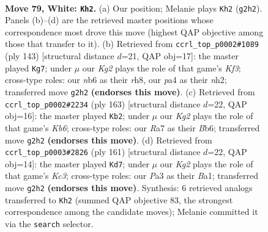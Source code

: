 \documentclass[11pt]{article}
\begin{document}
\clearpage

\begin{figure}[p]\centering
\begin{subfigure}{0.46\textwidth}\centering
\resizebox{\linewidth}{!}{%
\newchessgame
\chessboard[
  setfen={7k/R7/1n1r4/8/p4P1B/P6P/6K1/8 w - - 13 79},
  showmover=false,
  pgfstyle=straightmove, color=movearrow, markmove={g2-h2}
]}
\caption{}
\end{subfigure}\hfill
\begin{subfigure}{0.46\textwidth}\centering
\resizebox{\linewidth}{!}{%
\newchessgame
\chessboard[
  setfen={7R/8/5k2/5pp1/3P4/4K3/r6N/8 b - - 6 72},
  showmover=false,
  pgfstyle=straightmove, color=movearrow, markmove={f6-g7}
]}
\caption{}
\end{subfigure}
\\[4pt]
\begin{subfigure}{0.46\textwidth}\centering
\resizebox{\linewidth}{!}{%
\newchessgame
\chessboard[
  setfen={8/8/1b4K1/8/4N3/1k6/p4P2/4R3 b - - 1 82},
  showmover=false,
  pgfstyle=straightmove, color=movearrow, markmove={b3-b2}
]}
\caption{}
\end{subfigure}\hfill
\begin{subfigure}{0.46\textwidth}\centering
\resizebox{\linewidth}{!}{%
\newchessgame
\chessboard[
  setfen={8/8/2kp2P1/5K2/5N2/5R2/8/b5r1 b - - 0 81},
  showmover=false,
  pgfstyle=straightmove, color=movearrow, markmove={c6-d7}
]}
\caption{}
\end{subfigure}
\caption{\textbf{Move 79, White: \texttt{Kh2}.} (a) Our position; Melanie plays \texttt{Kh2} (\texttt{g2h2}). Panels (b)--(d) are the retrieved master positions whose correspondence most drove this move (highest QAP objective among those that transfer to it). (b) Retrieved from \texttt{ccrl\_top\_p0002\#1089} (ply 143) [structural distance $d$=21, QAP obj=17]: the master played \texttt{Kg7}; under $\mu$ our \emph{Kg2} plays the role of that game's \emph{Kf3}; cross-type roles: our \emph{n}b6 as their \emph{r}h8, our \emph{p}a4 as their \emph{n}h2; transferred move \texttt{g2h2} \textbf{(endorses this move)}. (c) Retrieved from \texttt{ccrl\_top\_p0002\#2234} (ply 163) [structural distance $d$=22, QAP obj=16]: the master played \texttt{Kb2}; under $\mu$ our \emph{Kg2} plays the role of that game's \emph{Kb6}; cross-type roles: our \emph{R}a7 as their \emph{B}b6; transferred move \texttt{g2h2} \textbf{(endorses this move)}. (d) Retrieved from \texttt{ccrl\_top\_p0003\#2826} (ply 161) [structural distance $d$=22, QAP obj=14]: the master played \texttt{Kd7}; under $\mu$ our \emph{Kg2} plays the role of that game's \emph{Kc3}; cross-type roles: our \emph{P}a3 as their \emph{B}a1; transferred move \texttt{g2h2} \textbf{(endorses this move)}. Synthesis: 6 retrieved analogs transferred to \texttt{Kh2} (summed QAP objective 83, the strongest correspondence among the candidate moves); Melanie committed it via the \texttt{search} selector.}
\label{fig:thought-m156}
\end{figure}
\end{document}
